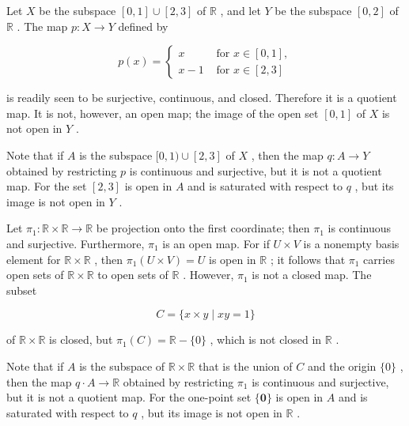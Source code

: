 \begin{example} Let \(X\) be the subspace \(\left\lbrack  {0,1}\right\rbrack   \cup  \left\lbrack  {2,3}\right\rbrack\) of \(\mathbb{R}\) , and let \(Y\) be the subspace \(\left\lbrack  {0,2}\right\rbrack\) of \(\mathbb{R}\) . The map \(p : X \rightarrow  Y\) defined by

\[
p\left( x\right)  = \left\{  \begin{array}{ll} x & \text{ for }x \in  \left\lbrack  {0,1}\right\rbrack  , \\  x - 1 & \text{ for }x \in  \left\lbrack  {2,3}\right\rbrack   \end{array}\right.
\]

is readily seen to be surjective, continuous, and closed. Therefore it is a quotient map. It is not, however, an open map; the image of the open set \(\left\lbrack  {0,1}\right\rbrack\) of \(X\) is not open in \(Y\) .

Note that if \(A\) is the subspace \(\lbrack 0,1) \cup  \left\lbrack  {2,3}\right\rbrack\) of \(X\) , then the map \(q : A \rightarrow  Y\) obtained by restricting \(p\) is continuous and surjective, but it is not a quotient map. For the set \(\left\lbrack  {2,3}\right\rbrack\) is open in \(A\) and is saturated with respect to \(q\) , but its image is not open in \(Y\) .
\end{example}

\begin{example} Let \({\pi }_{1} : \mathbb{R} \times  \mathbb{R} \rightarrow  \mathbb{R}\) be projection onto the first coordinate; then \({\pi }_{1}\) is continuous and surjective. Furthermore, \({\pi }_{1}\) is an open map. For if \(U \times  V\) is a nonempty basis element for \(\mathbb{R} \times  \mathbb{R}\) , then \({\pi }_{1}\left( {U \times  V}\right)  = U\) is open in \(\mathbb{R}\) ; it follows that \({\pi }_{1}\) carries open sets of \(\mathbb{R} \times  \mathbb{R}\) to open sets of \(\mathbb{R}\) . However, \({\pi }_{1}\) is not a closed map. The subset

\[
C = \{ x \times  y \mid  {xy} = 1\}
\]

of \(\mathbb{R} \times  \mathbb{R}\) is closed, but \({\pi }_{1}\left( C\right)  = \mathbb{R} - \{ 0\}\) , which is not closed in \(\mathbb{R}\) .

Note that if \(A\) is the subspace of \(\mathbb{R} \times  \mathbb{R}\) that is the union of \(C\) and the origin \(\{ 0\}\) , then the map \(q \cdot  A \rightarrow  \mathbb{R}\) obtained by restricting \({\pi }_{1}\) is continuous and surjective, but it is not a quotient map. For the one-point set \(\{ \mathbf{0}\}\) is open in \(A\) and is saturated with respect to \(q\) , but its image is not open in \(\mathbb{R}\) .
\end{example}

